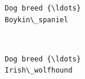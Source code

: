 \documentclass[11pt]{article}
\begin{document}
    \begin{Verbatim}[commandchars=\\\{\}]
Dog breed {\ldots}
Boykin\_spaniel

    \end{Verbatim}

    \begin{center}
    \end{center}
    { \hspace*{\fill} \\}
    
    \begin{Verbatim}[commandchars=\\\{\}]
Dog breed {\ldots}
Irish\_wolfhound

    \end{Verbatim}


    
    
    
    
\end{document}
